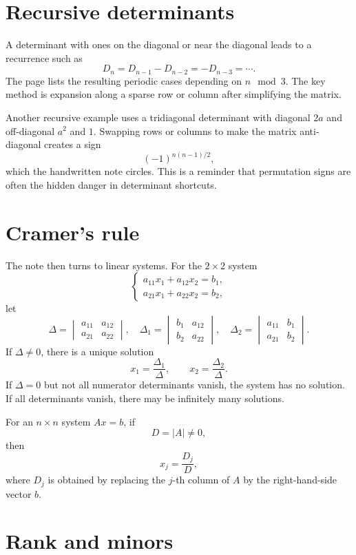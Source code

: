 \section{Recursive determinants}

A determinant with ones on the diagonal or near the diagonal leads to a recurrence such as
\[
  D_n=D_{n-1}-D_{n-2}=-D_{n-3}=\cdots.
\]
The page lists the resulting periodic cases depending on $n\mod 3$.  The key method is expansion along a sparse row or column after simplifying the matrix.

Another recursive example uses a tridiagonal determinant with diagonal $2a$ and off-diagonal $a^2$ and $1$.  Swapping rows or columns to make the matrix anti-diagonal creates a sign
\[
  (-1)^{n(n-1)/2},
\]
which the handwritten note circles.  This is a reminder that permutation signs are often the hidden danger in determinant shortcuts.

\section{Cramer's rule}

The note then turns to linear systems.  For the $2\times2$ system
\[
  \begin{cases}
  a_{11}x_1+a_{12}x_2=b_1,\\
  a_{21}x_1+a_{22}x_2=b_2,
  \end{cases}
\]
let
\[
  \Delta=\begin{vmatrix}a_{11}&a_{12}\\a_{21}&a_{22}\end{vmatrix},\quad
  \Delta_1=\begin{vmatrix}b_1&a_{12}\\b_2&a_{22}\end{vmatrix},\quad
  \Delta_2=\begin{vmatrix}a_{11}&b_1\\a_{21}&b_2\end{vmatrix}.
\]
If $\Delta\ne0$, there is a unique solution
\[
  x_1=
\frac{\Delta_1}{\Delta},\qquad
  x_2=
\frac{\Delta_2}{\Delta}.
\]
If $\Delta=0$ but not all numerator determinants vanish, the system has no solution.  If all determinants vanish, there may be infinitely many solutions.

For an $n\times n$ system $Ax=b$, if
\[
  D=|A|\ne0,
\]
then
\[
  x_j=
\frac{D_j}{D},
\]
where $D_j$ is obtained by replacing the $j$-th column of $A$ by the right-hand-side vector $b$.

\section{Rank and minors}

